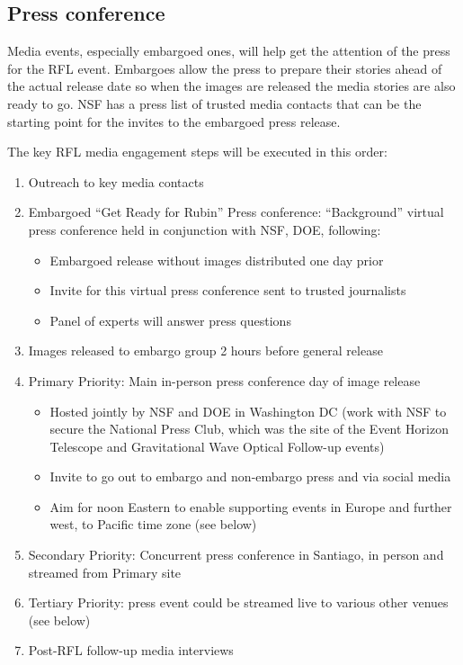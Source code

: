 \subsection{Press conference}



Media events, especially embargoed ones, will help get the attention of the press for the RFL event.
Embargoes allow the press to prepare their stories ahead of the actual release date so when the images
are released the media stories are also ready to go. NSF has a press list of trusted media contacts that
can be the starting point for the invites to the embargoed press release. 


The key RFL media engagement steps will be executed in this order:  
\begin{enumerate}
\item Outreach to key media contacts
\item Embargoed “Get Ready for Rubin” Press conference: ``Background'' virtual press conference held in
conjunction with NSF, DOE, following: 
  \begin{itemize} 
    \item Embargoed release without images distributed one day prior
    \item Invite for this virtual press conference sent to trusted journalists
    \item Panel of experts will answer press questions
  \end{itemize}
\item Images released to embargo group 2 hours before general release
\item Primary Priority: Main in-person press conference day of image release
  \begin{itemize}
  \item  Hosted jointly by NSF and DOE in Washington DC (work with NSF to secure the National Press Club,
        which was the site of the Event Horizon Telescope and Gravitational Wave Optical Follow-up events)
  \item Invite to go out to embargo and non-embargo press and via social media
  \item Aim for noon Eastern to enable supporting events in Europe and further west, to Pacific time zone (see below) 
  \end{itemize}
\item Secondary Priority: Concurrent press conference in Santiago, in person and streamed from Primary site 
\item Tertiary Priority: press event could be streamed live to various other venues (see below)
\item Post-RFL follow-up media interviews
\end{enumerate} 

